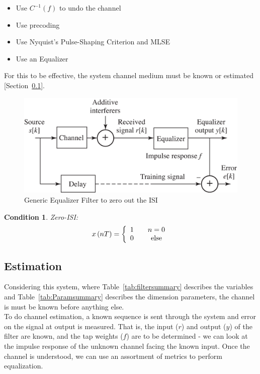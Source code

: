 \documentclass[]{article}
\newtheorem{thm}{Condition}
\begin{document}
\begin{itemize}
\item Use $C^{-1}\left(f\right)$ to undo the channel
\item Use precoding
\item Use Nyquist's Pulse-Shaping Criterion and MLSE
\item Use an Equalizer
\end{itemize}
For this to be effective, the system channel medium must be known or estimated [Section~\ref{sec:estimate}].\\

\begin{figure}[b]
\centering
\includegraphics[width=.6\textwidth]{equalizer.png}
\caption{Generic Equalizer Filter to zero out the ISI\label{fig:equalizer}}
\end{figure}

\begin{thm}
\label{thm:zero}
Zero-ISI:
$$x\left(nT\right) = \left\{
\begin{array}{c c}
1 & \quad n=0 \\
0 & \quad \text{else}
\end{array} \right.$$
\end{thm}

\subsection{Estimation}
\label{sec:estimate}
Considering this system, where Table~\ref{tab:filtersummary} describes the variables and Table~\ref{tab:Paramsummary} describes the dimension parameters, the channel is must be known before anything else. \\

To do channel estimation, a known sequence is sent through the system and error on the signal at output is measured.  That is, the input ($r$) and output ($y$) of the filter are known, and the tap weights ($f$) are to be determined - we can look at the impulse response of the unknown channel facing the known input.  Once the channel is understood, we can use an assortment of metrics to perform equalization.
\end{document}
